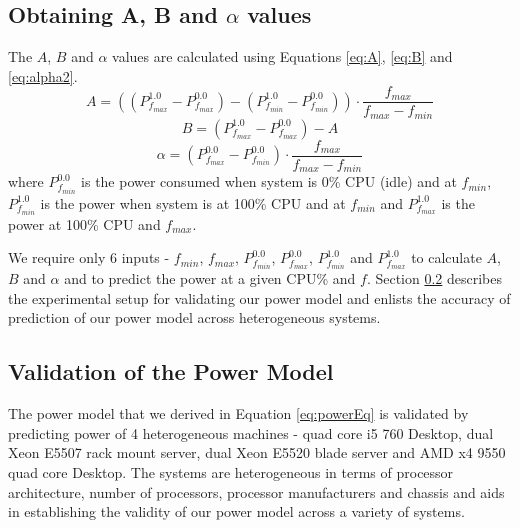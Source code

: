 \documentclass{sig-alternate}
\begin{document}
\subsection{
Obtaining A, B and $\alpha$ values}
The $A$, $B$ and $\alpha$ values are calculated using Equations \ref{eq:A}, \ref{eq:B} and \ref{eq:alpha2}. 
\begin{equation}
\label{eq:A}
A = ((P^{1.0}_{f_{max}} - P^{0.0}_{f_{max}})-(P^{1.0}_{f_{min}} - P^{0.0}_{f_{min}}))\cdot\frac{f_{max}}{f_{max}-f_{min}}
\end{equation}
\begin{equation}
\label{eq:B}
B = (P^{1.0}_{f_{max}} - P^{0.0}_{f_{max}})-A
\end{equation}
\begin{equation}
\label{eq:alpha2}
\alpha = (P^{0.0}_{f_{max}}-P^{0.0}_{f_{min}}) \cdot \frac{f_{max}}{f_{max}-f_{min}}
\end{equation}
where $P^{0.0}_{f_{min}}$ is the power consumed when system is 0\% CPU (idle) and at $f_{min}$, $P^{1.0}_{f_{min}}$ is the power when system is at 100\% CPU and at $f_{min}$ and $P^{1.0}_{f_{max}}$ is the power at 100\% CPU and $f_{max}$.


We require only 6 inputs - $f_{min}$, $f_{max}$, $ P^{0.0}_{f_{min}}$, $P^{0.0}_{f_{max}}$, $P^{1.0}_{f_{min}}$ and $P^{1.0}_{f_{max}}$ to calculate $A$, $B$ and $\alpha$ and to predict the power at a given CPU\% and $f$.
Section \ref{valWM} describes the experimental setup for validating our power model and enlists the accuracy of prediction of our power model across heterogeneous systems.



 \subsection{Validation of the Power Model}
 \label{valWM}

The power model that we derived in Equation \ref{eq:powerEq} is validated by predicting power of 4 heterogeneous machines - quad core i5 760 Desktop, dual Xeon E5507 rack mount server, dual Xeon E5520 blade server and AMD x4 9550 quad core Desktop. The systems are heterogeneous in terms of processor architecture, number of processors, processor manufacturers and chassis and aids in establishing the validity of our power model across a variety of systems. 
\end{document}
